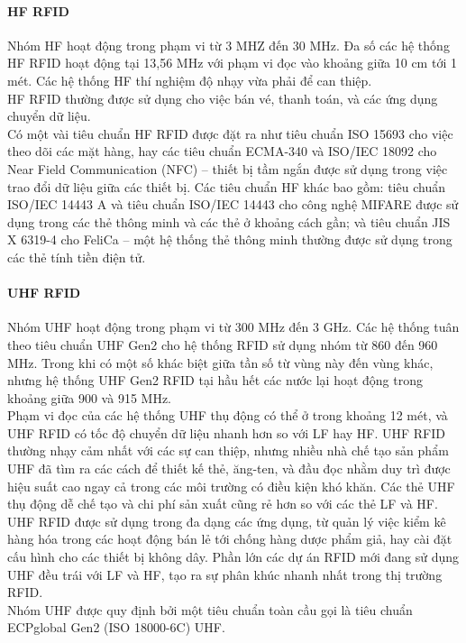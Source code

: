 \paragraph{HF RFID}
Nhóm HF hoạt động trong phạm vi từ 3 MHZ đến 30 MHz. Đa số các hệ thống HF RFID hoạt động tại 13,56 MHz với phạm vi đọc vào khoảng giữa 10 cm tới 1 mét. Các hệ thống HF thí nghiệm độ nhạy vừa phải để can thiệp.\\
HF RFID thường được sử dụng cho việc bán vé,  thanh toán, và các ứng dụng chuyển dữ liệu.\\
Có một vài tiêu chuẩn HF RFID được đặt ra như tiêu chuẩn ISO 15693 cho việc theo dõi các mặt hàng, hay các tiêu chuẩn ECMA-340 và ISO/IEC 18092 cho Near Field Communication (NFC) – thiết bị tầm ngắn được sử dụng  trong việc trao đổi dữ liệu giữa các thiết bị. Các tiêu chuẩn HF khác bao gồm: tiêu chuẩn ISO/IEC 14443 A và tiêu chuẩn ISO/IEC 14443 cho công nghệ MIFARE được sử dụng trong các thẻ thông minh và các thẻ ở khoảng cách gần; và tiêu chuẩn JIS X 6319-4 cho FeliCa – một hệ thống thẻ thông minh thường được sử dụng trong các thẻ tính tiền điện tử.
\paragraph{UHF RFID}
Nhóm UHF hoạt động trong phạm vi từ 300 MHz đến 3 GHz. Các hệ thống tuân theo tiêu chuẩn UHF Gen2 cho hệ thống RFID sử dụng nhóm từ 860 đến 960 MHz. Trong khi có một số khác biệt giữa tần số từ vùng này đến vùng khác, nhưng hệ thống UHF Gen2 RFID tại hầu hết các nước lại hoạt động trong khoảng giữa 900 và 915 MHz.\\
Phạm vi đọc của các hệ thống UHF thụ động có thể ở trong khoảng 12 mét, và UHF RFID có tốc độ chuyển dữ liệu nhanh hơn so với LF hay HF. UHF RFID thường nhạy cảm nhất với các sự can thiệp, nhưng nhiều nhà chế tạo sản phẩm UHF đã tìm ra các cách để thiết kế thẻ, ăng-ten, và đầu đọc nhằm duy trì được hiệu suất cao ngay cả trong các môi trường có điều kiện  khó khăn. Các thẻ UHF thụ động dễ chế tạo và  chi phí sản xuất cũng rẻ hơn so với các thẻ LF và HF.\\
UHF RFID được sử dụng  trong đa dạng các ứng dụng, từ quản lý việc kiểm kê hàng hóa trong các hoạt động bán lẻ tới chống hàng dược phẩm giả, hay cài đặt cấu hình cho các thiết bị không dây. Phần lớn  các dự án RFID mới đang sử dụng  UHF đều trái với LF và HF, tạo ra sự phân khúc nhanh nhất trong thị trường RFID.\\
Nhóm UHF được quy định bởi một tiêu chuẩn toàn cầu gọi là tiêu chuẩn ECPglobal Gen2 (ISO 18000-6C) UHF.
\label{ref{fig2_7}}

